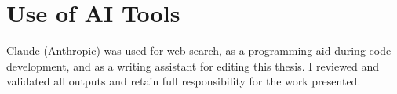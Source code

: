 \chapter*{Use of AI Tools}
Claude (Anthropic) was used for web search, as a programming aid during code development, and as a writing assistant for editing this thesis.
I reviewed and validated all outputs and retain full responsibility for the work presented.
